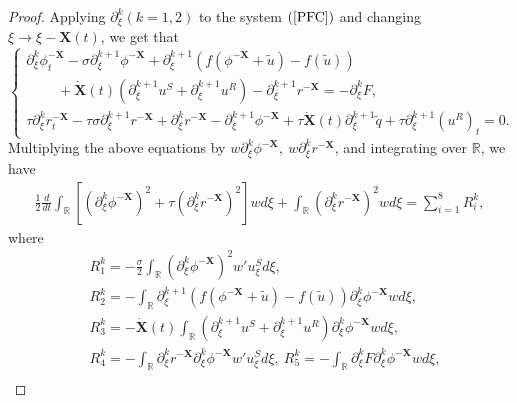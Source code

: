 \documentclass[10pt,reqno]{amsart}
\numberwithin{equation}{section}
\begin{document}
	\begin{proof}
		Applying $\partial_{\xi}^k(k=1,2)$ to the system $(\ref{PFC})$ and changing $\xi\to\xi-\mathbf{X}(t)$, we get that
		\begin{equation}\label{HPFC}
			\left\{\begin{array}{l}\partial_{\xi}^k\phi_{t}^{-\mathbf{X}}-\sigma \partial_{\xi}^{k+1}\phi^{-\mathbf{X}}+\partial_{\xi}^{k+1}\left(f\left(\phi^{-\mathbf{X}}+\tilde{u}\right)-f\left(\tilde{u}\right)\right)\\
				\ \ \ \ \ \ \ \ \ \ +\dot{\mathbf{X}}(t)\left(\partial_{\xi}^{k+1}u^{S}+\partial_{\xi}^{k+1}u^{R}\right)-\partial_{\xi}^{k+1}r^{-\mathbf{X}}=-\partial_{\xi}^kF, \\ 
				\tau \partial_{\xi}^kr_{t}^{-\mathbf{X}}-\tau\sigma\partial_{\xi}^{k+1} r^{-\mathbf{X}}+\partial_{\xi}^kr^{-\mathbf{X}}-\partial_{\xi}^{k+1}\phi^{-\mathbf{X}}+\tau \dot{\mathbf{X}}(t) \partial_{\xi}^{k+1}\tilde{q}+\tau \partial_{\xi}^{k+1}\left(u^{R}\right)_{t}=0.\end{array}\right. 
		\end{equation}
		Multiplying the above equations by $w\partial_{\xi}^k\phi^{-\mathbf{X}},\ w\partial_{\xi}^kr^{-\mathbf{X}}$, and integrating over $\mathbb{R}$, we have
		\begin{equation}\label{gjfc}
			\begin{aligned}
				\frac{1}{2}\frac{d}{dt}\int_{\mathbb{R}}\left[\left(\partial_{\xi}^k\phi^{-\mathbf{X}}\right)^2+\tau \left(\partial_{\xi}^kr^{-\mathbf{X}}\right)^2\right]wd\xi+\int_{\mathbb{R}} \left(\partial_{\xi}^kr^{-\mathbf{X}}\right)^2wd\xi=\sum_{i=1}^{8}R_i^k,
			\end{aligned}
		\end{equation}
		where
		\begin{align*}
			&R_1^k=-\frac{\sigma}{2}\int_{\mathbb{R}}\left(\partial_{\xi}^k\phi^{-\mathbf{X}}\right)^2w'u_{\xi}^Sd\xi,\\
			&R_2^k=-\int_{\mathbb{R}}\partial_{\xi}^{k+1}\left(f\left(\phi^{-\mathbf{X}}+\tilde{u}\right)-f\left(\tilde{u}\right)\right)\partial_{\xi}^k\phi^{-\mathbf{X}}wd\xi,\\
			&R_3^k=-\dot{\mathbf{X}}(t)\int_{\mathbb{R}}\left(\partial_{\xi}^{k+1}u^{S}+\partial_{\xi}^{k+1}u^{R}\right)\partial_{\xi}^k\phi^{-\mathbf{X}}wd\xi,\\
			&R_4^k=-\int_{\mathbb{R}}\partial_{\xi}^kr^{-\mathbf{X}}\partial_{\xi}^k\phi^{-\mathbf{X}}w'u_{\xi}^Sd\xi,\ R_5^k=-\int_{\mathbb{R}}\partial_{\xi}^kF\partial_{\xi}^k\phi^{-\mathbf{X}}wd\xi,\\

\end{align*}
\end{proof}
\end{document}

